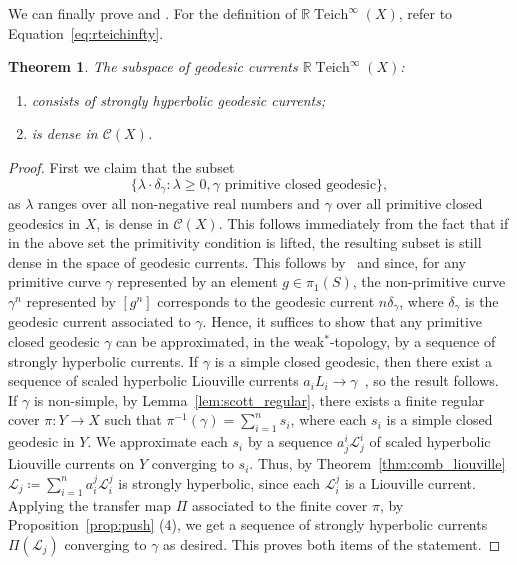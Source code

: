 \documentclass[12pt]{amsart}
\numberwithin{equation}{section}
\numberwithin{figure}{section}
\newtheorem{theorem}[equation]{Theorem}
\theoremstyle{definition}
\theoremstyle{plain}
\newcommand\C{\mathcal{C}}
\DeclareMathOperator{\Teich}{Teich}
\begin{document}
We can finally prove  and . For the definition of $\mathbb{R}\Teich^{\infty}(X)$, refer to Equation~\eqref{eq:rteichinfty}.
\begin{theorem}
The subspace of geodesic currents $\mathbb{R}\Teich^{\infty}(X)$:
\begin{enumerate}
    \item consists of strongly hyperbolic geodesic currents;
    \item is dense in $\C(X)$.
\end{enumerate}
\label{thm:sh_dense}
\end{theorem}
\begin{proof}
First we claim that the subset \[
\{ \lambda \cdot \delta_{\gamma} : \lambda \geq 0, \gamma \text{ primitive closed geodesic}\},\]
as $\lambda$ ranges over all non-negative real numbers and $\gamma$ over all primitive closed geodesics in $X$,
is dense in $\C(X)$.
 This follows immediately from the fact that if in the above set the primitivity condition is lifted, the resulting subset is still dense in the space of geodesic currents. This follows by~\cite[Proposition~4.4]{Bonahon86:EndsHyperbolicManifolds} and since, for any primitive curve $\gamma$ represented by an element $g \in \pi_1(S)$, the non-primitive curve $\gamma^n$ represented by $[g^n]$ corresponds to the geodesic current $n \delta_{\gamma}$, where $\delta_{\gamma}$ is the geodesic current associated to $\gamma$.
 Hence, it suffices to show that any primitive closed geodesic $\gamma$ can be approximated, in the weak$^*$-topology, by a sequence of strongly hyperbolic currents.
If $\gamma$ is a simple closed geodesic, then there exist a sequence of scaled hyperbolic Liouville currents $a_i L_i \to \gamma$~\cite[Proposition~14]{Bonahon88:GeodesicCurrent}, so the result follows.
If $\gamma$ is non-simple, by Lemma~\ref{lem:scott_regular}, there exists a finite regular cover $\pi \colon Y \to X$ such that $\pi^{-1}(\gamma)=\sum_{i=1}^n s_i$, where each $s_i$ is a simple closed geodesic in $Y$. We approximate each $s_i$ by a sequence $a_j^i \mathcal{L}_j^i$ of scaled hyperbolic Liouville currents on $Y$ converging to $s_i$.
 Thus, by Theorem~\ref{thm:comb_liouville}
 $\mathcal{L}_j \coloneqq \sum_{i=1}^n a_i^j \mathcal{L}_i^j$ is strongly hyperbolic, since each $\mathcal{L}_i^j$ is a Liouville current.
Applying the transfer map $\Pi$ associated to the finite cover $\pi$, by Proposition~\ref{prop:push} (4), we get a sequence of strongly hyperbolic currents $\Pi(\mathcal{L}_j)$ converging to $\gamma$ as desired. This proves both items of the statement.
\end{proof}
\end{document}
